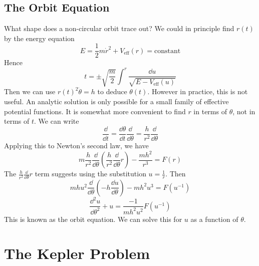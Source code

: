 \documentclass{article}
\begin{document}
\subsection{The Orbit Equation}
What shape does a non-circular orbit trace out? We could in principle find $r(t)$ by the energy equation
\[ E = \frac{1}{2}m \dot r^2 + V_\text{eff}(r) = \text{constant} \]
Hence
\[ t = \pm \sqrt{\frac{m}{2}} \int^r \frac{\dd{u}}{\sqrt{E - V_\text{eff}(u)}} \]
Then we can use $r(t)^2\dot \theta = h$ to deduce $\theta(t)$. However in practice, this is not useful. An analytic solution is only possible for a small family of effective potential functions. It is somewhat more convenient to find $r$ in terms of $\theta$, not in terms of $t$. We can write
\[ \frac{\dd}{\dd{t}} = \frac{\dd \theta}{\dd{t}} \frac{\dd}{\dd \theta} = \frac{h}{r^2} \frac{\dd}{\dd \theta} \]
Applying this to Newton's second law, we have
\[ m\frac{h}{r^2} \frac{\dd}{\dd \theta}\left( \frac{h}{r^2} \frac{\dd}{\dd \theta} r \right) - \frac{mh^2}{r^3} = F(r) \]
The $\frac{h}{r^2} \frac{\dd}{\dd \theta} r$ term suggests using the substitution $u = \frac{1}{r}$. Then
\[ mhu^2 \frac{\dd}{\dd \theta}\left( -h\frac{\dd{u}}{\dd \theta} \right) - mh^2u^3 = F(u^{-1}) \]
\[ \frac{\dd^2 u}{\dd \theta^2} + u = \frac{-1}{mh^2u^2}F(u^{-1}) \]
This is known as the orbit equation. We can solve this for $u$ as a function of $\theta$.

\section{The Kepler Problem}
\end{document}
